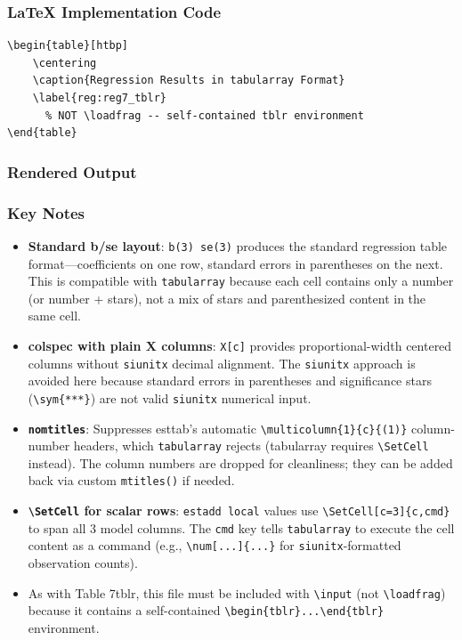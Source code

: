 \documentclass[11pt]{article}
\numberwithin{table}{section}
\newcommand{\loadfrag}[1]{%
	\begin{filecontents*}{#1}%
	\end{filecontents*}%
	\CatchFileDef{\mytable}{#1}{}%
}
\begin{document}
\subsubsection{LaTeX Implementation Code}
\begin{lstlisting}[style=latex]
\begin{table}[htbp]
    \centering
    \caption{Regression Results in tabularray Format}
    \label{reg:reg7_tblr}
      % NOT \loadfrag -- self-contained tblr environment
\end{table}
\end{lstlisting}

\subsubsection{Rendered Output}
\begin{table}[htbp]
    \centering
    \caption{Regression Results in tabularray Format}
    \label{reg:reg7_tblr_render}
    
\end{table}

\subsubsection{Key Notes}
\begin{itemize}
    \item \textbf{Standard b/se layout}: \texttt{b(3) se(3)} produces the standard regression table format---coefficients on one row, standard errors in parentheses on the next. This is compatible with \texttt{tabularray} because each cell contains only a number (or number + stars), not a mix of stars and parenthesized content in the same cell.
    \item \textbf{colspec with plain X columns}: \texttt{X[c]} provides proportional-width centered columns without \texttt{siunitx} decimal alignment. The \texttt{siunitx} approach is avoided here because standard errors in parentheses and significance stars (\texttt{\textbackslash sym\{***\}}) are not valid \texttt{siunitx} numerical input.
    \item \textbf{\texttt{nomtitles}}: Suppresses esttab's automatic \texttt{\textbackslash multicolumn\{1\}\{c\}\{(1)\}} column-number headers, which \texttt{tabularray} rejects (tabularray requires \texttt{\textbackslash SetCell} instead). The column numbers are dropped for cleanliness; they can be added back via custom \texttt{mtitles()} if needed.
    \item \textbf{\texttt{\textbackslash SetCell} for scalar rows}: \texttt{estadd local} values use \texttt{\textbackslash SetCell[c=3]\{c,cmd\}} to span all 3 model columns. The \texttt{cmd} key tells \texttt{tabularray} to execute the cell content as a command (e.g., \texttt{\textbackslash num[...]\{...\}} for \texttt{siunitx}-formatted observation counts).
    \item As with Table 7\textunderscore tblr, this file must be included with \texttt{\textbackslash input} (not \texttt{\textbackslash loadfrag}) because it contains a self-contained \texttt{\textbackslash begin\{tblr\}...\textbackslash end\{tblr\}} environment.
\end{itemize}
\end{document}
